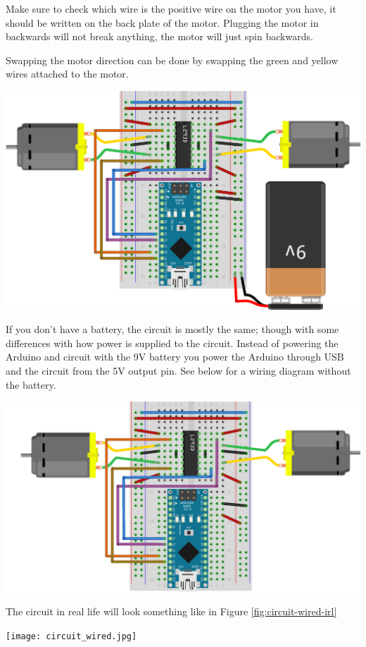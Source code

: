 \documentclass[../TinyBot.tex]{subfiles}
\begin{document}
Make sure to check which wire is the positive wire on the motor you have, it should be written on the back plate of the motor. Plugging the motor in backwards will not break anything, the motor will just spin backwards. 

Swapping the motor direction can be done by swapping the green and yellow wires attached to the motor. 
\\

\begin{center}
    \includegraphics[width=\textwidth]{resources/H-bridge-nano_bb.png}
    \label{fig:schematic-hbridge-battery}
\end{center}


If you don't have a battery, the circuit is mostly the same; though with some differences with how power is supplied to the circuit. Instead of powering the Arduino and circuit with the 9V battery you power the Arduino through USB and the circuit from the 5V output pin. See below for a wiring diagram without the battery.


\begin{center}
    \includegraphics[width=\textwidth]{resources/H-bridge-nano-without-battery_bb.png}
    \label{fig:schematic-hbridge-nobattery}
\end{center}


The circuit in real life will look something like in Figure \ref{fig:circuit-wired-irl}

\begin{center}
    \texttt{[image: circuit\_wired.jpg]}
    \label{fig:circuit-wired-irl}
\end{center}
\end{document}
